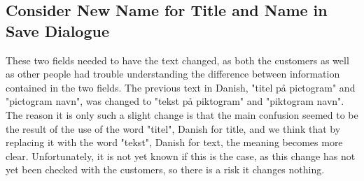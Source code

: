 \subsection{Consider New Name for Title and Name in Save Dialogue}
These two fields needed to have the text changed, as both the customers as well as other people had trouble understanding the difference between information contained in the two fields.
The previous text in Danish, "titel på pictogram" and "pictogram navn", was changed to "tekst på piktogram" and "piktogram navn". The reason it is only such a slight change is that the main confusion seemed to be the result of the use of the word "titel", Danish for title, and we think that by replacing it with the word "tekst", Danish for text, the meaning becomes more clear. Unfortunately, it is not yet known if this is the case, as this change has not yet been checked with the customers, so there is a risk it changes nothing.
